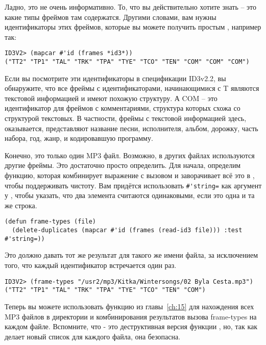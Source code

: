 Ладно, это не очень информативно. То, что вы действительно хотите знать -- это какие типы
фреймов там содержатся. Другими словами, вам нужны идентификаторы этих фреймов, которые вы
можете получить простым , например так:

\begin{lstlisting}
ID3V2> (mapcar #'id (frames *id3*))
("TT2" "TP1" "TAL" "TRK" "TPA" "TYE" "TCO" "TEN" "COM" "COM" "COM")
\end{lstlisting}

Если вы посмотрите эти идентификаторы в спецификации ID3v2.2, вы обнаружите, что все
фреймы с идентификаторами, начинающимися с T являются текстовой информацией и имеют
похожую структуру. А COM -- это идентификатор для фреймов с комментариями, структура
которых схожа со структурой текстовых. В частности, фреймы с текстовой информацией здесь,
оказывается, представляют название песни, исполнителя, альбом, дорожку, часть набора, год,
жанр, и кодировавшую программу.

Конечно, это только один MP3 файл. Возможно, в других файлах используются другие
фреймы. Это достаточно просто определить. Для начала, определим функцию, которая
комбинирует выражение  с вызовом  и заворачивает всё это в
, чтобы поддерживать чистоту. Вам придётся использовать
\lstinline!#'string=! как аргумент  у , чтобы указать,
что два элемента считаются одинаковыми, если это одна и та же строка.

\begin{lstlisting}
(defun frame-types (file)
  (delete-duplicates (mapcar #'id (frames (read-id3 file))) :test #'string=))
\end{lstlisting}

Это должно давать тот же результат для такого же имени файла, за исключением того, что
каждый идентификатор встречается один раз.

\begin{lstlisting}
ID3V2> (frame-types "/usr2/mp3/Kitka/Wintersongs/02 Byla Cesta.mp3")
("TT2" "TP1" "TAL" "TRK" "TPA" "TYE" "TCO" "TEN" "COM")
\end{lstlisting}

Теперь вы можете использовать функцию  из главы~\ref{ch:15} для
нахождения всех MP3 файлов в директории и комбинирования результатов вызова frame-types на
каждом файле. Вспомните, что  - это деструктивная версия функции
, но, так как  делает новый список для каждого файла, она
безопасна.

